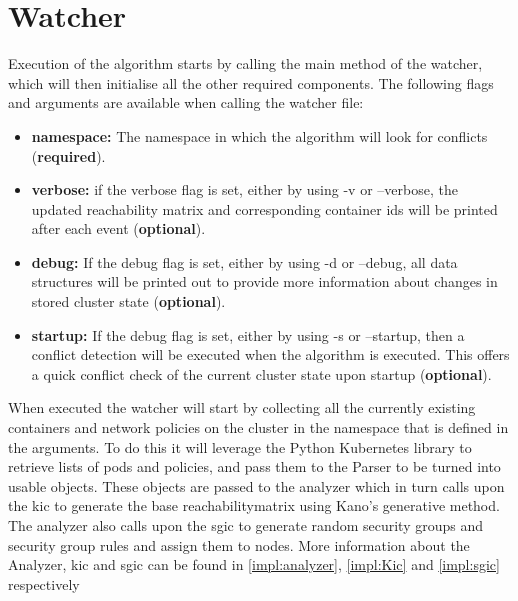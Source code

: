 \section{Watcher} \label{impl:watcher} Execution of the algorithm starts by calling the main method of the watcher, which will then initialise all the other required components. The following flags and arguments are available when calling the watcher file:
\begin{itemize}
    \renewcommand{\labelitemi}{\scriptsize$\blacksquare$}
    \item \textbf{namespace:} The namespace in which the algorithm will look for conflicts (\textbf{required}).
    \item \textbf{verbose:} if the verbose flag is set, either by using -v or --verbose, the updated reachability matrix and corresponding container ids will be printed after each event (\textbf{optional}). 
    \item \textbf{debug:} If the debug flag is set, either by using -d or --debug, all data structures will be printed out to provide more information about changes in stored cluster state (\textbf{optional}).
    \item \textbf{startup:} If the debug flag is set, either by using -s or --startup, then a conflict detection will be executed when the algorithm is executed. This offers a quick conflict check of the current cluster state upon startup (\textbf{optional}).
\end{itemize}
When executed the watcher will start by collecting all the currently existing containers and network policies on the cluster in the namespace that is defined in the arguments. To do this it will leverage the Python Kubernetes library to retrieve lists of pods and policies, and pass them to the Parser to be turned into usable objects. These objects are passed to the analyzer which in turn calls upon the \acrlong{kic} to generate the base reachabilitymatrix using Kano's generative method. The analyzer also calls upon the \acrlong{sgic} to generate random security groups and security group rules and assign them to nodes. More information about the Analyzer, \acrshort{kic} and \acrshort{sgic} can be found in \autoref{impl:analyzer}, \autoref{impl:Kic} and \autoref{impl:sgic} respectively
\\[10pt]

